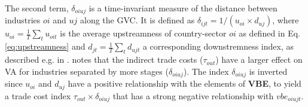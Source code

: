\documentclass[a4paper]{article}
\begin{document}
The second term, $\delta_{oiuj}$ is a time-invariant measure of the distance between industries $oi$ and $uj$ along the GVC. It is defined as $\delta_{ijt} = 1/(u_{oi}\times d_{uj})$, where $u_{oi} = \frac{1}{T}\sum_t u_{oit}$ is the average upstreamness of country-sector $oi$ as defined in Eq. \ref{eq:upstreamness} and $d_{jt} = \frac{1}{T}\sum_t d_{ujt}$ a corresponding downstremness index, as described e.g. in \citet{antras2022global}. \citet{Kummritz20161} notes that the indirect trade costs ($\tau_{out}$) have a larger effect on VA for industries separated by more stages ($\delta_{oiuj}$). The index $\delta_{oiuj}$ is inverted since $u_{oi}$ and $d_{uj}$ have a positive relationship with the elements of \textbf{VBE}, to yield a trade cost index $\tau_{out}\times \delta_{oiuj}$ that has a strong negative relationship with $vbe_{oiujt}$. \newline 
\end{document}
